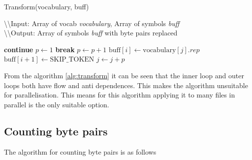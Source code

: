 \documentclass{article}
\begin{document}
\begin{algorithm}[H]
    \caption{Transform(vocabulary, buff)} \label{alg:transform}
    \textbackslash \textbackslash Input: Array of vocab \textit{vocabulary}, Array of symbols \textit{buff} \\
    \textbackslash \textbackslash Output: Array of symbols \textit{buff} with byte pairs replaced
    \begin{algorithmic}[1]
                    \State \textbf{continue}
                \EndIf
                    \State $p \gets 1$
                            \State \textbf{break}
                        \EndIf
                        \State $p \gets p + 1$
                    \EndWhile 
                        \State $\text{buff}[i] \gets \text{vocabulary}[j].rep$
                        \State $\text{buff}[i+1] \gets \text{SKIP\_TOKEN}$
                    \EndIf
                    \State $j \gets j + p$
                \EndIf
            \EndFor
        \EndFor
    \end{algorithmic}    
\end{algorithm}

From the algorithm \ref{alg:transform} it can be seen that the inner loop and outer loops both have 
flow and anti dependences. This makes the algorithm unsuitable for parallelisation. This means for this algorithm applying
it to many files in parallel is the only suitable option.

\subsection{Counting byte pairs}

The algorithm for counting byte pairs is as follows
\end{document}
